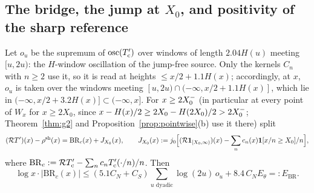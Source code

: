 \subsection{The bridge, the jump at \texorpdfstring{$X_0$}{X0}, and positivity of the sharp reference}\label{sec:noise-bridge}

\begin{proposition}\label{prop:br}
Let $o_u$ be the supremum of $\operatorname{osc}(T'_{\mathrm{c}})$ over windows of length $2.04H(u)$ meeting $[u,2u)$: the $H$-window oscillation of
the jump-free source. Only the kernels $C_n$ with $n\ge2$ use it, so it is read at heights $\le x/2+1.1H(x)$; accordingly, at $x$,
$o_u$ is taken over the windows meeting $[u,2u)\cap(-\infty,x/2+1.1H(x)]$, which lie in $(-\infty,x/2+3.2H(x)]\subset(-\infty,x]$.
For $x\ge2X_0^{-}$
(in particular at every point of $W_x$ for $x\ge2X_0$, since $x-H(x)/2\ge2X_0-H(2X_0)/2>2X_0^{-}$; Theorem~\ref{thm:g2} and
Proposition~\ref{prop:pointwise}(b) use it there) split
\[
  (\mathcal{R} T')(x)-\rho^{\mathrm{sh}}(x)=\mathrm{BR}_c(x)+J_{X_0}(x),\qquad
  J_{X_0}(x):=j_0\Big[(\mathcal{R}\mathbf 1_{[X_0,\infty)})(x)-\sum_nc_n(x)\mathbf 1[x/n\ge X_0]/n\Big],
\]
where $\mathrm{BR}_c:=\mathcal{R}T'_{\mathrm{c}}-\sum_nc_nT'_{\mathrm{c}}(\cdot/n)/n$. Then
\[
  \log x\cdot|\mathrm{BR}_c(x)|\le(5.1C_N+C_S)\sum_{u\text{ dyadic}}\log(2u)\,o_u+8.4\,C_NE_\theta=:E_{\mathrm{BR}} .
\]
\end{proposition}

